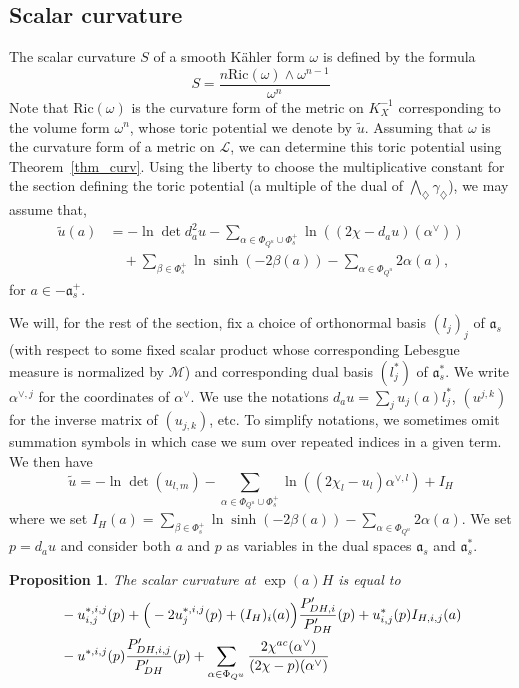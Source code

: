 \documentclass{amsart}
\newtheorem{prop}[thm]{Proposition}
\theoremstyle{definition}
\begin{document}
\subsection{Scalar curvature}

The scalar curvature $S$ of 
a smooth Kähler form $\omega$ is defined by the 
formula 
\[
S=\frac{n\mathrm{Ric}(\omega)\wedge \omega^{n-1}}{\omega^n}
\]
Note that $\mathrm{Ric}(\omega)$ is the curvature form of the metric 
on $K_X^{-1}$ corresponding to the volume form 
$\omega^n$,  
whose toric potential we denote by $\tilde{u}$. 
Assuming that $\omega$ is the curvature form of a metric on 
$\mathcal{L}$, we can determine this toric 
potential using Theorem~\ref{thm_curv}.
Using the liberty to choose the multiplicative constant for the section 
defining the toric potential (a multiple of the dual of 
$\bigwedge_{\diamondsuit}\gamma_{\diamondsuit}$), 
we may assume that, 
\begin{align*}
\tilde{u}(a)& = -\ln\det d^2_au
-\sum_{\alpha\in\Phi_{Q^u}\cup\Phi_s^+}\ln((2\chi-d_au)(\alpha^{\vee}))
\\ & \quad 
+\sum_{\beta\in \Phi_s^+}\ln \sinh(-2\beta(a))
-\sum_{\alpha\in\Phi_{Q^u}}2\alpha(a),
\end{align*}
for $a\in -\mathfrak{a}_s^+$.

We will, for the rest of the section, fix a choice of 
orthonormal basis $(l_j)_j$ of $\mathfrak{a}_s$ (with respect to some 
fixed scalar product whose corresponding Lebesgue measure is normalized 
by $\mathcal{M}$) and 
corresponding dual basis $(l_j^*)$ of $\mathfrak{a}_s^*$.
We write $\alpha^{\vee,j}$ for the 
coordinates of $\alpha^{\vee}$. 
We use the notations $d_au=\sum_ju_j(a)l_j^*$, $(u^{j,k})$ for the 
inverse matrix of $(u_{j,k})$, etc.
To simplify notations, we sometimes omit summation symbols in which case 
we sum over repeated indices in a given term.
We then have 
\[
\tilde{u}=-\ln\det (u_{l,m})
-\sum_{\alpha\in\Phi_{Q^u}\cup\Phi_s^+}\ln((2\chi_l-u_l)\alpha^{\vee,l})
+I_H
\]
where we set $I_H(a)=\sum_{\beta\in \Phi_s^+}\ln \sinh(-2\beta(a))
-\sum_{\alpha\in\Phi_{Q^u}}2\alpha(a)$. 
We set $p=d_au$ and consider both $a$ and $p$ as variables in the dual 
spaces $\mathfrak{a}_s$ and $\mathfrak{a}_s^*$.

\begin{prop}
\label{prop_scalar_curvature}
The scalar curvature at $\exp(a)H$ is equal to 
\begin{align*}
& -u^{*,i,j}_{i,j}(p)
+\Big{(}-2u^{*,i,j}_j(p)+(I_H)_i(a)\Big{)}\frac{P_{DH,i}'}{P_{DH}'}(p)
+u^*_{i,j}(p)I_{H,i,j}(a)
\\ & 
 -u^{*,i,j}(p)\frac{P_{DH,i,j}'}{P_{DH}'}(p)
+\sum_{\alpha\in \Phi_{Q^u}}\frac{2\chi^{ac}(\alpha^{\vee})}{(2\chi-p)(\alpha^{\vee})}
\end{align*}
\end{prop}
\end{document}
